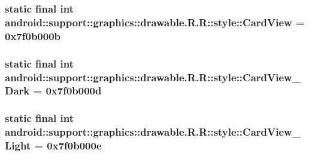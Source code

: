 \hypertarget{classandroid_1_1support_1_1graphics_1_1drawable_1_1_r_1_1style_5455965016394d99f0522cb3ae6e8f62}{
\subsubsection[{CardView}]{\setlength{\rightskip}{0pt plus 5cm}static final int android::support::graphics::drawable.R.R::style::CardView = 0x7f0b000b}}
\label{classandroid_1_1support_1_1graphics_1_1drawable_1_1_r_1_1style_5455965016394d99f0522cb3ae6e8f62}


\hypertarget{classandroid_1_1support_1_1graphics_1_1drawable_1_1_r_1_1style_ee6e1dcf49b947446d12db4359b07826}{
\subsubsection[{CardView\_\-Dark}]{\setlength{\rightskip}{0pt plus 5cm}static final int android::support::graphics::drawable.R.R::style::CardView\_\-Dark = 0x7f0b000d}}
\label{classandroid_1_1support_1_1graphics_1_1drawable_1_1_r_1_1style_ee6e1dcf49b947446d12db4359b07826}


\hypertarget{classandroid_1_1support_1_1graphics_1_1drawable_1_1_r_1_1style_d2d02a6928fb88f16815c1caa6fdb625}{
\subsubsection[{CardView\_\-Light}]{\setlength{\rightskip}{0pt plus 5cm}static final int android::support::graphics::drawable.R.R::style::CardView\_\-Light = 0x7f0b000e}}
\label{classandroid_1_1support_1_1graphics_1_1drawable_1_1_r_1_1style_d2d02a6928fb88f16815c1caa6fdb625}


